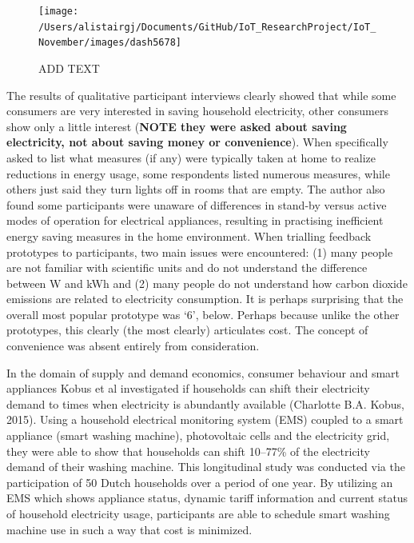 \documentclass[11pt,]{article}
\begin{document}
\begin{figure}[H]

{\centering \texttt{[image: /Users/alistairgj/Documents/GitHub/IoT\_ResearchProject/IoT\_November/images/dash5678]} 

}

\caption{ADD TEXT}\label{fig:unnamed-chunk-5}
\end{figure}

The results of qualitative participant interviews clearly showed that
while some consumers are very interested in saving household
electricity, other consumers show only a little interest (\textbf{NOTE
they were asked about saving electricity, not about saving money or
convenience}). When specifically asked to list what measures (if any)
were typically taken at home to realize reductions in energy usage, some
respondents listed numerous measures, while others just said they turn
lights off in rooms that are empty. The author also found some
participants were unaware of differences in stand-by versus active modes
of operation for electrical appliances, resulting in practising
inefficient energy saving measures in the home environment. When
trialling feedback prototypes to participants, two main issues were
encountered: (1) many people are not familiar with scientific units and
do not understand the difference between W and kWh and (2) many people
do not understand how carbon dioxide emissions are related to
electricity consumption. It is perhaps surprising that the overall most
popular prototype was `6', below. Perhaps because unlike the other
prototypes, this clearly (the most clearly) articulates cost. The
concept of convenience was absent entirely from consideration.

In the domain of supply and demand economics, consumer behaviour and
smart appliances Kobus et al investigated if households can shift their
electricity demand to times when electricity is abundantly available
(Charlotte B.A. Kobus, 2015). Using a household electrical monitoring
system (EMS) coupled to a smart appliance (smart washing machine),
photovoltaic cells and the electricity grid, they were able to show that
households can shift 10--77\% of the electricity demand of their washing
machine. This longitudinal study was conducted via the participation of
50 Dutch households over a period of one year. By utilizing an EMS which
shows appliance status, dynamic tariff information and current status of
household electricity usage, participants are able to schedule smart
washing machine use in such a way that cost is minimized.
\end{document}
